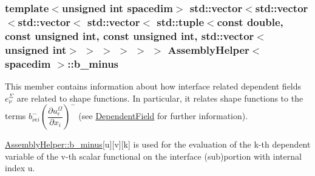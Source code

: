 \subsubsection[{\texorpdfstring{b\+\_\+minus}{b_minus}}]{\setlength{\rightskip}{0pt plus 5cm}template$<$unsigned int spacedim$>$ std\+::vector$<$std\+::vector$<$std\+::vector$<$ std\+::vector$<$ std\+::tuple$<$const double, const unsigned int, const unsigned int, std\+::vector$<$unsigned int$>$ $>$ $>$ $>$ $>$ $>$ {\bf Assembly\+Helper}$<$ spacedim $>$\+::b\+\_\+minus\hspace{0.3cm}{\ttfamily [private]}}\hypertarget{class_assembly_helper_a6f51f8b4dfdae385a2e2fe2dd9e66cdb}{}\label{class_assembly_helper_a6f51f8b4dfdae385a2e2fe2dd9e66cdb}
This member contains information about how interface related dependent fields $e^\Sigma_\nu$ are related to shape functions. In particular, it relates shape functions to the terms $b^-_{\nu\epsilon i} \left(\dfrac{\partial u^\Omega_\epsilon}{\partial x_i}\right)^-$ (see \hyperlink{class_dependent_field}{Dependent\+Field} for further information).

\hyperlink{class_assembly_helper_a6f51f8b4dfdae385a2e2fe2dd9e66cdb}{Assembly\+Helper\+::b\+\_\+minus}\mbox{[}{\ttfamily u}\mbox{]}\mbox{[}{\ttfamily v}\mbox{]}\mbox{[}{\ttfamily k}\mbox{]} is used for the evaluation of the {\ttfamily k-\/th} dependent variable of the {\ttfamily v-\/th} scalar functional on the interface (sub)portion with internal index {\ttfamily u}.

